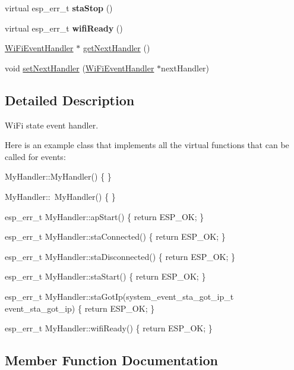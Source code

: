 \begin{DoxyCompactItemize}
\item 
virtual esp\+\_\+err\+\_\+t {\bfseries sta\+Stop} ()\hypertarget{class_wi_fi_event_handler_a1b3311f207915c563e37da0a7ae901ac}{}\label{class_wi_fi_event_handler_a1b3311f207915c563e37da0a7ae901ac}

\item 
virtual esp\+\_\+err\+\_\+t {\bfseries wifi\+Ready} ()\hypertarget{class_wi_fi_event_handler_a52ccc311c3ddd1c1da162da356bee2e8}{}\label{class_wi_fi_event_handler_a52ccc311c3ddd1c1da162da356bee2e8}

\item 
\hyperlink{class_wi_fi_event_handler}{Wi\+Fi\+Event\+Handler} $\ast$ \hyperlink{class_wi_fi_event_handler_a0b24b1ee868a02ec650205f79b0b04c4}{get\+Next\+Handler} ()
\item 
void \hyperlink{class_wi_fi_event_handler_afee45469141ee1351e06609ad0050133}{set\+Next\+Handler} (\hyperlink{class_wi_fi_event_handler}{Wi\+Fi\+Event\+Handler} $\ast$next\+Handler)
\end{DoxyCompactItemize}


\subsection{Detailed Description}
Wi\+Fi state event handler. 

Here is an example class that implements all the virtual functions that can be called for events\+:


\begin{DoxyCode}
MyHandler::MyHandler() \{
\}

MyHandler::~MyHandler() \{
\}

esp\_err\_t MyHandler::apStart() \{
  \textcolor{keywordflow}{return} ESP\_OK;
\}

esp\_err\_t MyHandler::staConnected() \{
  \textcolor{keywordflow}{return} ESP\_OK;
\}

esp\_err\_t MyHandler::staDisconnected() \{
  \textcolor{keywordflow}{return} ESP\_OK;
\}

esp\_err\_t MyHandler::staStart() \{
  \textcolor{keywordflow}{return} ESP\_OK;
\}

esp\_err\_t MyHandler::staGotIp(system\_event\_sta\_got\_ip\_t event\_sta\_got\_ip) \{
  \textcolor{keywordflow}{return} ESP\_OK;
\}

esp\_err\_t MyHandler::wifiReady() \{
  \textcolor{keywordflow}{return} ESP\_OK;
\}
\end{DoxyCode}
 

\subsection{Member Function Documentation}
